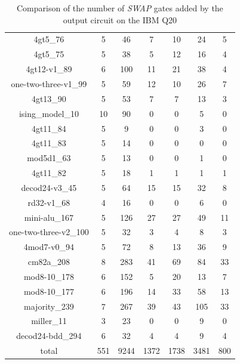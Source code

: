 \documentclass[runningheads]{llncs}
\begin{document}
\begin{table}[H]
\begin{center}
\begin{tabular}{|c|c|c|c|c|c|c|}
4gt5\_76 & 5 & 46 & 7 & 10 & 24 & 5 \\ 
4gt5\_75 & 5 & 38 & 5 & 12 & 16 & 4 \\ 
4gt12-v1\_89 & 6 & 100 & 11 & 21 & 38 & 4 \\ 
one-two-three-v1\_99 & 5 & 59 & 12 & 10 & 26 & 7 \\ 
4gt13\_90 & 5 & 53 & 7 & 7 & 13 & 3 \\ 
ising\_model\_10 & 10 & 90 & 0 & 0 & 5 & 0 \\ 
4gt11\_84 & 5 & 9 & 0 & 0 & 3 & 0 \\ 
4gt11\_83 & 5 & 14 & 0 & 0 & 0 & 0 \\ 
mod5d1\_63 & 5 & 13 & 0 & 0 & 1 & 0 \\ 
4gt11\_82 & 5 & 18 & 1 & 1 & 1 & 1 \\ 
decod24-v3\_45 & 5 & 64 & 15 & 15 & 32 & 8 \\ 
rd32-v1\_68 & 4 & 16 & 0 & 0 & 6 & 0 \\ 
mini-alu\_167 & 5 & 126 & 27 & 27 & 49 & 11 \\ 
one-two-three-v2\_100 & 5 & 32 & 3 & 4 & 8 & 3 \\ 
4mod7-v0\_94 & 5 & 72 & 8 & 13 & 36 & 9 \\ 
cm82a\_208 & 8 & 283 & 41 & 69 & 84 & 33 \\ 
mod8-10\_178 & 6 & 152 & 5 & 20 & 13 & 7 \\ 
mod8-10\_177 & 6 & 196 & 14 & 33 & 58 & 13 \\ 
majority\_239 & 7 & 267 & 39 & 43 & 105 & 33 \\ 
miller\_11 & 3 & 23 & 0 & 0 & 9 & 0 \\ 
decod24-bdd\_294 & 6 & 32 & 4 & 4 & 9 & 4 \\ 
\hline
total & 551 & 9244 & 1372 & 1738 & 3481 & 800 \\
		\hline
		\end{tabular} 
		\end{center} 
		\caption{Comparison of the number of \textit{SWAP} gates added by the 
		output circuit on the IBM Q20 } 
		\label{tab3}
		\end{table}	
\end{document}
